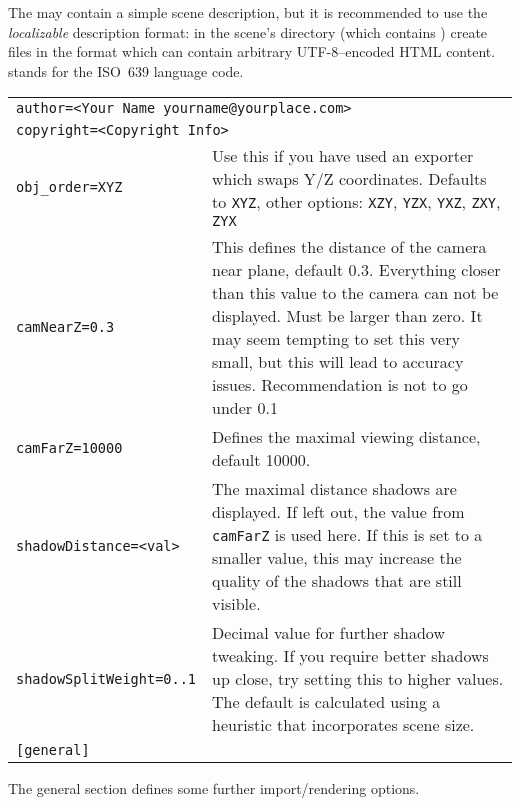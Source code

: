 \noindent The  may contain a simple scene description, but it is
recommended to use the \emph{localizable} description format: in the scene's
directory (which contains ) create files in the format
 which can contain arbitrary
UTF-8--encoded HTML content.  stands for the ISO~639
language code.

\noindent%
\begin{longtable}{lp{92mm}} 
\multicolumn{2}{l}{\texttt{author=<Your Name yourname@yourplace.com>}}\\
\multicolumn{2}{l}{\texttt{copyright=<Copyright Info>}}\\
\texttt{obj\_order=XYZ}      & Use this if you have used an exporter which swaps Y/Z coordinates. 
                               Defaults to \texttt{XYZ}, other options: \texttt{XZY}, \texttt{YZX}, \texttt{YXZ}, \texttt{ZXY}, \texttt{ZYX}\\
\texttt{camNearZ=0.3}        & This defines the distance of the camera near plane, default 0.3.
                               Everything closer than this value to the camera can not be 
                               displayed. Must be larger than zero. It may seem tempting 
                               to set this very small, but this will lead to accuracy issues. 
                               Recommendation is not to go under 0.1\\
\texttt{camFarZ=10000}       & Defines the maximal viewing distance, default 10000.\\
\texttt{shadowDistance=<val>}& The maximal distance shadows are displayed. If left out, the
                               value from \texttt{camFarZ} is used here. If this is set to a smaller
                               value, this may increase the quality of the shadows that are
                               still visible.\\
\texttt{shadowSplitWeight=0..1}& Decimal value for further shadow tweaking. If you require
                                 better shadows up close, try setting this to higher values.
                                 The default is calculated using a heuristic that incorporates
                                 scene size.\\
\texttt{[general]}&\\
\end{longtable}

\noindent The general section defines some further import/rendering options.


